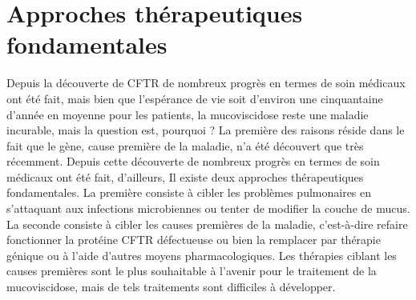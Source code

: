 
\chapter{Approches thérapeutiques fondamentales} %


\label{ch:02-03} %


Depuis la découverte de CFTR de nombreux progrès en termes de soin médicaux ont été fait, mais bien que l’espérance de vie soit d’environ une cinquantaine d’année en moyenne pour les patients, la mucoviscidose reste une maladie incurable, mais la question est, pourquoi ?
La première des raisons réside dans le fait que le gène, cause première de la maladie, n’a été découvert que très récemment. Depuis cette découverte de nombreux progrès en termes de soin médicaux ont été fait, d’ailleurs, Il existe deux approches thérapeutiques fondamentales. La première consiste à cibler les problèmes pulmonaires en s’attaquant aux infections microbiennes ou tenter de modifier la couche de mucus. La seconde consiste à cibler les causes premières de la maladie, c’est-à-dire refaire fonctionner la protéine CFTR défectueuse ou bien la remplacer par thérapie génique ou à l’aide d’autres moyens pharmacologiques. Les thérapies ciblant les causes premières sont le plus souhaitable à l’avenir pour le traitement de la mucoviscidose, mais de tels traitements sont difficiles à développer.
